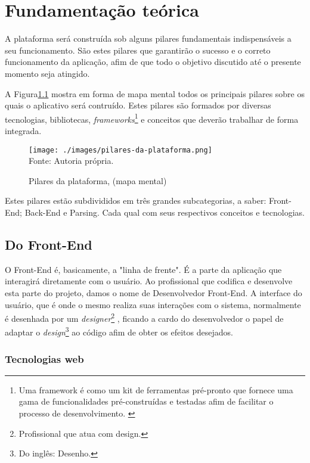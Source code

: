 \chapter{Fundamentação teórica}

A plataforma será construída sob alguns pilares fundamentais indispensáveis
a seu funcionamento. São estes pilares que garantirão o sucesso e o correto
funcionamento da aplicação, afim de que todo o objetivo discutido até o
presente momento seja atingido.

A
Figura\ref{fig:pilares-da-plataforma}
mostra em forma de mapa mental todos os principais pilares sobre os quais
o aplicativo será contruído. Estes pilares são formados por diversas
tecnologias, bibliotecas,
\textit{frameworks}\footnote{Uma framework é como um kit de ferramentas pré-pronto que fornece uma gama
    de funcionalidades pré-construídas e testadas afim de facilitar o processo
    de desenvolvimento. \cite{amazon-framework}
}
e conceitos que deverão trabalhar de forma integrada.

\begin{figure}[ht]
    \centering
    \caption{Pilares da plataforma, (mapa mental)}
    \texttt{[image: ./images/pilares-da-plataforma.png]}
    \label{fig:pilares-da-plataforma} \\
    \textnormal{\fontsize{10pt}{12pt}Fonte: Autoria própria.}
\end{figure}

Estes pilares estão subdivididos em três grandes subcategorias, a saber: Front-End;
Back-End e Parsing. Cada qual com seus respectivos conceitos e tecnologias.

\section{Do Front-End}

O Front-End é, basicamente, a "linha de frente". É a parte da aplicação que interagirá
diretamente com o usuário. Ao profissional que codifica e desenvolve esta parte do
projeto, damos o nome de Desenvolvedor Front-End. A interface do usuário, que é
onde o mesmo realiza suas interações com o sistema, normalmente é desenhada por
um
\textit{designer}\footnote{Profissional que atua com design.
}
, ficando a cardo do desenvolvedor o papel de adaptar o
\textit{design}\footnote{Do inglês: Desenho.
}
ao código afim de obter os efeitos desejados.
\cite{totvs-front-end}

\subsection{Tecnologias web}

